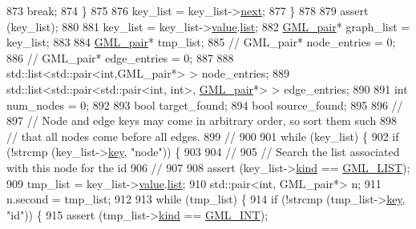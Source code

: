 \begin{DoxyCode}
873         \textcolor{keywordflow}{break};
874     \}
875     
876     key\_list = key\_list->\mbox{\hyperlink{struct_g_m_l__pair_aef47e6103f05e1411fa55f731972b592}{next}};
877     \}
878 
879     assert (key\_list);
880 
881     key\_list = key\_list->\mbox{\hyperlink{struct_g_m_l__pair_aef8797e7d2fc0d2e2f628ce9c2783a6c}{value}}.\mbox{\hyperlink{union_g_m_l__pair__val_ad9d038864154789007178fbf4d43ec9d}{list}};
882     \mbox{\hyperlink{struct_g_m_l__pair}{GML\_pair}}* graph\_list = key\_list;
883 
884     \mbox{\hyperlink{struct_g_m_l__pair}{GML\_pair}}* tmp\_list;
885     \textcolor{comment}{// GML\_pair* node\_entries = 0;}
886     \textcolor{comment}{// GML\_pair* edge\_entries = 0;}
887     
888     std::list<std::pair<int,GML\_pair*> > node\_entries;
889     std::list<std::pair<std::pair<int, int>, \mbox{\hyperlink{struct_g_m_l__pair}{GML\_pair}}*> > edge\_entries;
890     
891     \textcolor{keywordtype}{int} num\_nodes = 0; 
892 
893     \textcolor{keywordtype}{bool} target\_found;
894     \textcolor{keywordtype}{bool} source\_found;
895 
896     \textcolor{comment}{//}
897     \textcolor{comment}{// Node and edge keys may come in arbitrary order, so sort them such}
898     \textcolor{comment}{// that all nodes come before all edges.}
899     \textcolor{comment}{//}
900     
901     \textcolor{keywordflow}{while} (key\_list) \{
902     \textcolor{keywordflow}{if} (!strcmp (key\_list->\mbox{\hyperlink{struct_g_m_l__pair_a00e5de36c09fef63b8d439b4341f0655}{key}}, \textcolor{stringliteral}{"node"})) \{
903 
904         \textcolor{comment}{//}
905         \textcolor{comment}{// Search the list associated with this node for the id}
906         \textcolor{comment}{//}
907 
908         assert (key\_list->\mbox{\hyperlink{struct_g_m_l__pair_ab63f19fdd3fc40bfaba08d3af1a927d8}{kind}} == \mbox{\hyperlink{gml__scanner_8h_a2dc4839311e05f9a17adefcd0012b77fa0f6c57e598f6d261bd378b1f21d22172}{GML\_LIST}});
909         tmp\_list = key\_list->\mbox{\hyperlink{struct_g_m_l__pair_aef8797e7d2fc0d2e2f628ce9c2783a6c}{value}}.\mbox{\hyperlink{union_g_m_l__pair__val_ad9d038864154789007178fbf4d43ec9d}{list}};
910         std::pair<int, GML\_pair*> n;
911         n.second = tmp\_list;
912 
913         \textcolor{keywordflow}{while} (tmp\_list) \{
914         \textcolor{keywordflow}{if} (!strcmp (tmp\_list->\mbox{\hyperlink{struct_g_m_l__pair_a00e5de36c09fef63b8d439b4341f0655}{key}}, \textcolor{stringliteral}{"id"})) \{
915             assert (tmp\_list->\mbox{\hyperlink{struct_g_m_l__pair_ab63f19fdd3fc40bfaba08d3af1a927d8}{kind}} == \mbox{\hyperlink{gml__scanner_8h_a2dc4839311e05f9a17adefcd0012b77fa9c67cc9c0b45542b05cfe2097996541d}{GML\_INT}});

\end{DoxyCode}
